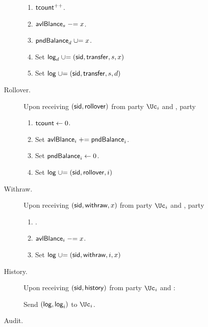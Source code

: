 \begin{functionality}
\begin{description}
\begin{enumerate}
				\item $\mathsf{tcount}^{++}$.
				
				
			\item $\mathsf{avlBlance}_s \mathrel{-}= x$.
			
			\item   $\mathsf{pndBalance}_d \mathrel{\cup}= x$.
			
			\item Set $\mathsf{log}_d \mathrel{\cup}= {(\mathsf{sid},\mathsf{transfer},s,x)}$
			
			\item Set $\mathsf{log} \mathrel{\cup}= {(\mathsf{sid},\mathsf{transfer},s,d)}$
			
		\end{enumerate}
		
		\item[Rollover.]     Upon receiving $(\mathsf{sid},\mathsf{rollover})$ from  party $\Uc_i$ and \Cc,  party \Cc
		
		\begin{enumerate}
			
			
			\item $\mathsf{tcount} \leftarrow 0$.
			
			
			\item Set $\mathsf{avlBlance}_i  \mathrel{+}= \mathsf{pndBalance}_i$.
			
			\item Set $\mathsf{pndBalance}_i  \leftarrow 0$.
			
			\item Set $\mathsf{log} \mathrel{\cup}= (\mathsf{sid},\mathsf{rollover},i)$
			
			
		\end{enumerate}

		
			\item[Withraw.]     Upon receiving $(\mathsf{sid},\mathsf{withraw},x)$ from  party $\Uc_i$ and \Cc,  party \Cc
		
		\begin{enumerate}
			
			
			 \item \Assert{$x\in \N$, $\balance_i  \ge x$ and $i \in [n]$}.
			
			\item $\mathsf{avlBlance}_i \mathrel{-}= x$.
			
			
			\item Set $\mathsf{log} \mathrel{\cup}= {(\mathsf{sid},\mathsf{withraw},i,x)}$
			
			
		\end{enumerate}
		
		
		\item[History.]     Upon receiving $(\mathsf{sid},\mathsf{history})$ from  party $\Uc_i$ and \Cc:  
		
		Send $(\mathsf{log},\mathsf{log}_i)$ to  $\Uc_i$.	 
		
		\item[Audit.]      
		
	\end{description}

\end{functionality}


